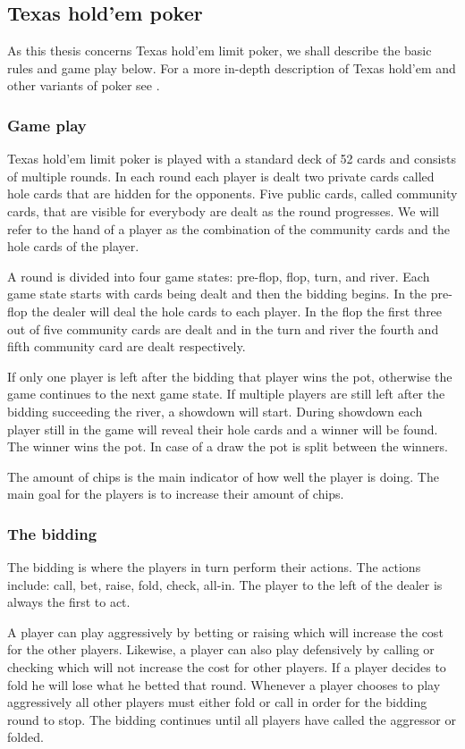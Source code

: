 \subsection*{Texas hold'em poker}
As this thesis concerns Texas hold'em limit poker, we shall describe the basic rules and game play below. For a more in-depth description of Texas hold'em and other variants of poker see \cite{poker-rules}. 


\subsubsection*{Game play}
Texas hold'em limit poker is played with a standard deck of 52 cards and consists of multiple rounds. In each round each player is dealt two private cards called hole cards that are hidden for the opponents. Five public cards, called community cards, that are visible for everybody are dealt as the round progresses. We will refer to the hand of a player as the combination of the community cards and the hole cards of the player.

A round is divided into four game states: pre-flop, flop, turn, and river. Each game state starts with cards being dealt and then the bidding begins. In the pre-flop the dealer will deal the hole cards to each player. In the flop the first three out of five community cards are dealt and in the turn and river the fourth and fifth community card are dealt respectively. 

If only one player is left after the bidding that player wins the pot, otherwise the game continues to the next game state. If multiple players are still left after the bidding succeeding the river, a showdown will start. During showdown each player still in the game will reveal their hole cards and a winner will be found. The winner wins the pot. In case of a draw the pot is split between the winners.

The amount of chips is the main indicator of how well the player is doing. The main goal for the players is to increase their amount of chips.

\subsubsection*{The bidding}
The bidding is where the players in turn perform their actions. The actions include: call, bet, raise, fold, check, all-in. The player to the left of the dealer is always the first to act.

A player can play aggressively by betting or raising which will increase the cost for the other players. Likewise, a player can also play defensively by calling or checking which will not increase the cost for other players. If a player decides to fold he will lose what he betted that round. Whenever a player chooses to play aggressively all other players must either fold or call in order for the bidding round to stop. The bidding continues until all players have called the aggressor or folded.

